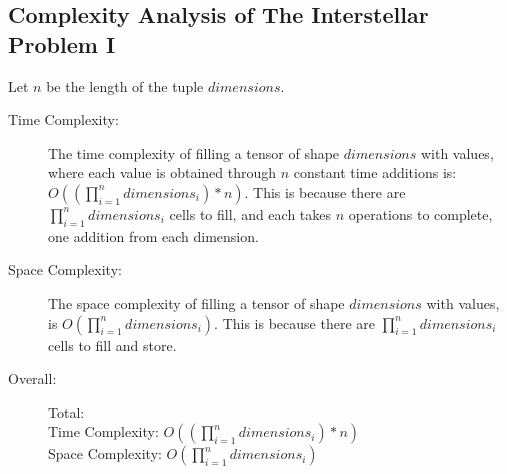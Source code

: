 \subsection{Complexity Analysis of The Interstellar Problem I}
Let $n$ be the length of the tuple $dimensions$.
\begin{description}
    \item[Time Complexity:]
        The time complexity of filling a tensor of shape $dimensions$ with values,
        where each value is obtained through $n$ constant time additions is:\\$O((\prod_{i=1}^{n} dimensions_i) * n)$. This is because there are $\prod_{i=1}^{n} dimensions_i$ cells to fill, and each takes $n$ operations to complete, one addition from each dimension.
        
    \item[Space Complexity:] 
    The space complexity of filling a tensor of shape $dimensions$ with values,
    is $O(\prod_{i=1}^{n} dimensions_i)$.
    This is because there are $\prod_{i=1}^{n} dimensions_i$ cells to fill and store.
    
    \item[Overall:] Total:\\
        Time Complexity: $O((\prod_{i=1}^{n} dimensions_i) * n)$\\
        Space Complexity: $O(\prod_{i=1}^{n} dimensions_i)$

\end{description}


